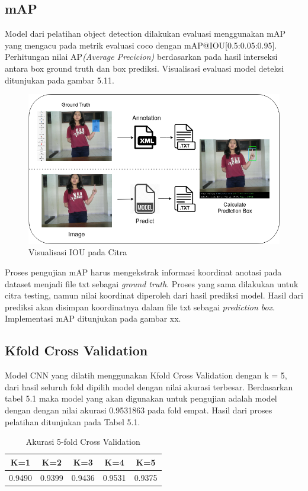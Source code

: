\subsection{mAP}
Model dari pelatihan object detection dilakukan evaluasi menggunakan mAP yang mengacu pada metrik evaluasi coco dengan mAP@IOU[0.5:0.05:0.95]. Perhitungan nilai AP\textit{(Average Precicion)} berdasarkan pada hasil interseksi antara box ground truth dan box prediksi. Visualisasi evaluasi model deteksi ditunjukan pada gambar 5.11.
\begin{figure}[H]
	\centering
	\includegraphics[width=0.8\linewidth]{calcmap}
	\caption{Visualisasi IOU pada Citra}
	\label{fig:handdetection203}
\end{figure}
Proses pengujian mAP harus mengekstrak informasi koordinat anotasi pada dataset menjadi file txt sebagai \textit{ground truth}. Proses yang sama dilakukan untuk citra testing, namun nilai koordinat diperoleh dari hasil prediksi model. Hasil dari prediksi akan disimpan koordinatnya dalam file txt sebagai \textit{prediction box}. Implementasi mAP ditunjukan pada gambar xx.
\subsection{Kfold Cross Validation}
Model CNN yang dilatih menggunakan Kfold Cross Validation dengan k = 5, dari hasil seluruh fold dipilih model dengan nilai akurasi terbesar. Berdasarkan tabel 5.1 maka model yang akan digunakan untuk pengujian adalah model dengan dengan nilai akurasi 0.9531863 pada fold empat. Hasil dari proses pelatihan ditunjukan pada Tabel 5.1.
\begin{table}[H]
	\caption{Akurasi 5-fold Cross Validation}
	\vspace{0cm}
	\centering
	\begin{tabular}{|c|c|c|c|c|}
		\hline K=1 &  K=2 &K=3 & K=4 &K=5\\
		\hline  0.9490& 0.9399 & 0.9436& 0.9531 &0.9375 \\
		\hline
	\end{tabular}
\end{table}


